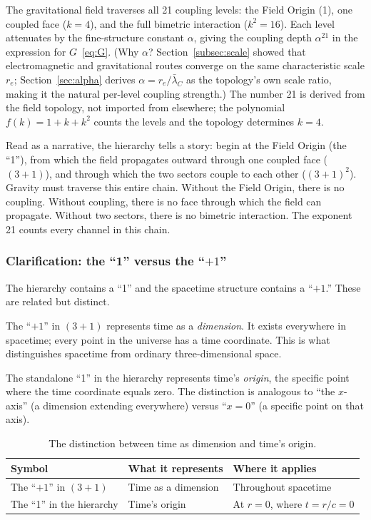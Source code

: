 \documentclass[aps,prd,preprint,superscriptaddress,showpacs,preprintnumbers,amsmath,amssymb,nofootinbib]{revtex4-2}
\begin{document}
The gravitational field traverses all 21 coupling levels: the Field Origin (1), one coupled face ($k = 4$), and the full bimetric interaction ($k^2 = 16$). Each level attenuates by the fine-structure constant $\alpha$, giving the coupling depth $\alpha^{21}$ in the expression for $G$~\eqref{eq:G}. (Why $\alpha$? Section~\ref{subsec:scale} showed that electromagnetic and gravitational routes converge on the same characteristic scale $r_e$; Section~\ref{sec:alpha} derives $\alpha = r_e/\bar{\lambda}_C$ as the topology's own scale ratio, making it the natural per-level coupling strength.) The number 21 is derived from the field topology, not imported from elsewhere; the polynomial $f(k) = 1 + k + k^2$ counts the levels and the topology determines $k = 4$.

Read as a narrative, the hierarchy tells a story: begin at the Field Origin (the ``1''), from which the field propagates outward through one coupled face ($(3+1)$), and through which the two sectors couple to each other ($\left(3+1\right)^2$). Gravity must traverse this entire chain. Without the Field Origin, there is no coupling. Without coupling, there is no face through which the field can propagate. Without two sectors, there is no bimetric interaction. The exponent 21 counts every channel in this chain.

\subsubsection*{Clarification: the ``1'' versus the ``$+1$''}

The hierarchy contains a ``1'' and the spacetime structure contains a ``$+1$.'' These are related but distinct.

The ``$+1$'' in $(3+1)$ represents time as a \emph{dimension}. It exists everywhere in spacetime; every point in the universe has a time coordinate. This is what distinguishes spacetime from ordinary three-dimensional space.

The standalone ``1'' in the hierarchy represents time's \emph{origin}, the specific point where the time coordinate equals zero. The distinction is analogous to ``the $x$-axis'' (a dimension extending everywhere) versus ``$x = 0$'' (a specific point on that axis).

\begin{table}[H]
\centering
\begin{tabular*}{0.95\textwidth}{@{\extracolsep{\fill}} lll @{}}
\toprule
\textbf{Symbol} & \textbf{What it represents} & \textbf{Where it applies} \\
\midrule
The ``$+1$'' in $(3+1)$ & Time as a dimension & Throughout spacetime \\
The ``1'' in the hierarchy & Time's origin & At $r = 0$, where $t = r/c = 0$ \\
\bottomrule
\end{tabular*}
\caption{The distinction between time as dimension and time's origin.}
\label{tab:one-vs-plusone}
\end{table}
\end{document}
